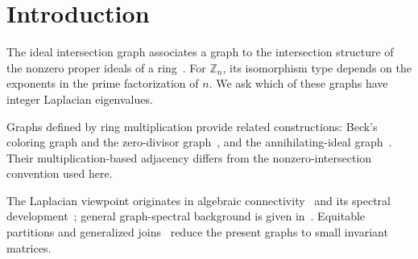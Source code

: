 \section{Introduction}

The ideal intersection graph associates a graph to the intersection
structure of the nonzero proper ideals of a ring~\cite{intersection}.
For $\mathbb Z_n$, its isomorphism type depends on the exponents in the
prime factorization of $n$. We ask which of these graphs have integer
Laplacian eigenvalues.

Graphs defined by ring multiplication provide related constructions:
Beck's coloring graph and the zero-divisor graph~\cite{beck,anderson},
and the annihilating-ideal graph~\cite{behboodi1,behboodi2,aalipour}.
Their multiplication-based adjacency differs from the nonzero-intersection
convention used here.

The Laplacian viewpoint originates in algebraic connectivity~\cite{fiedler}
and its spectral development~\cite{grone,merris}; general graph-spectral
background is given in~\cite{cvetkovic,brouwer}. Equitable partitions and
generalized joins~\cite{godsilroyle,cardoso} reduce the present graphs to
small invariant matrices.

